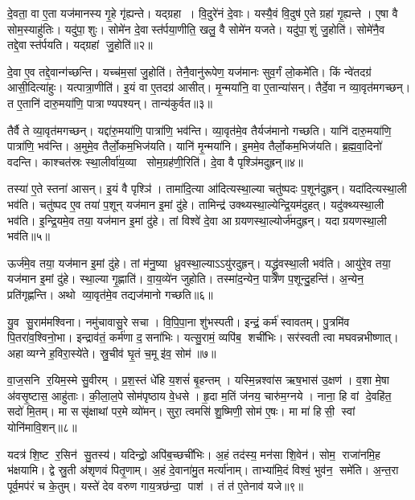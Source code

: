 दे॒वता॒ वा ए॒ता यज॑मानस्य गृ॒हे गृ॑ह्यन्ते।
यद्ग्रहा।
वि॒दुरे॑नं दे॒वाः।
यस्यै॒वं वि॒दुष॑ ए॒ते ग्रहा॑ गृ॒ह्यन्ते।
ए॒षा वै सोम॒स्याहु॑तिः।
यदु॑पा॒शुः।
सोमे॑न दे॒वास्त॑र्पया॒णीति॒ खलु॒ वै सोमे॑न यजते।
यदु॑पा॒शुं जु॒होति॑।
सोमे॑नै॒व तद्दे॒वास्त॑र्पयति।
यद्ग्रहां जु॒होति॑॥२॥

दे॒वा ए॒व तद्दे॒वान्ग॑च्छन्ति।
यच्च॑म॒सां जु॒होति॑।
तेनै॒वानु॑रूपेण॒ यज॑मानः सुव॒र्गं लो॒कमे॑ति।
किं न्वे॑तदग्र॑ आसी॒दित्या॑हुः।
यत्पात्रा॒णीति॑।
इ॒यं वा ए॒तदग्र॑ आसीत्।
मृ॒न्मया॑नि॒ वा ए॒तान्या॑सन्।
तैर्दे॒वा न व्या॒वृत॑मगच्छन्।
त ए॒तानि॑ दारु॒मया॑णि॒ पात्राण्यपश्यन्।
तान्य॑कुर्वत॥३॥

तैर्वै ते व्या॒वृत॑मगच्छन्।
यद्दा॑रु॒मया॑णि॒ पात्रा॑णि॒ भव॑न्ति।
व्या॒वृत॑मे॒व तैर्यज॑मानो गच्छति।
यानि॑ दारु॒मया॑णि॒ पात्रा॑णि॒ भव॑न्ति।
अ॒मुमे॒व तैर्लो॒कम॒भिज॑यति।
यानि॑ मृ॒न्मया॑नि।
इ॒ममे॒व तैर्लो॒कम॒भिज॑यति।
ब्र॒ह्म॒वा॒दिनो॑ वदन्ति।
काश्चत॑स्रः स्था॒लीर्वा॑य॒व्या सोम॒ग्रह॑णी॒रिति॑।
दे॒वा वै पृश्ञि॑मदुह्रन्॥४॥

तस्या॑ ए॒ते स्तना॑ आसन्।
इ॒यं वै पृश्ञि॑।
तामा॑दि॒त्या आ॑दित्यस्था॒ल्या चतु॑ष्पदः प॒शून॑दुह्रन्।
यदा॑दित्यस्था॒ली भव॑ति।
चतु॑ष्पद ए॒व तया॑ प॒शून् यज॑मान इ॒मां दु॑हे।
तामिन्द्र॑ उक्थ्यस्था॒ल्येन्द्रि॒यम॑दुहत्।
यदु॑क्थ्यस्था॒ली भव॑ति।
इ॒न्द्रि॒यमे॒व तया॒ यज॑मान इ॒मां दु॑हे।
तां विश्वे॑ दे॒वा आग्रयणस्था॒ल्योर्ज॑मदुह्रन्।
यदाग्रयणस्था॒ली भव॑ति॥५॥

ऊर्ज॑मे॒व तया॒ यज॑मान इ॒मां दु॑हे।
तां म॑नु॒ष्या ध्रुवस्था॒ल्याऽऽयु॑रदुह्रन्।
यद्ध्रु॑वस्था॒ली भव॑ति।
आयु॑रे॒व तया॒ यज॑मान इ॒मां दु॑हे।
स्था॒ल्या गृ॒ह्णाति॑।
वा॒य॒व्ये॑न जुहोति।
तस्मा॑द॒न्येन॒ पात्रे॑ण प॒शून्दु॒हन्ति॑।
अ॒न्येन॒ प्रति॑गृह्णन्ति।
अथो व्या॒वृत॑मे॒व तद्यज॑मानो गच्छति॥६॥\anuvakamend[ग्र॒ह॒त्वं ग्रहां जु॒होत्य॑कुर्वतादुह्रन्नाग्रयणस्था॒ली भव॑ति॒ नव॑ च]

यु॒व सु॒राम॑मश्विना।
नमु॑चावासु॒रे सचा।
वि॒पि॒पा॒ना शु॑भस्पती।
इन्द्रं॒ कर्म॑ स्वावतम्।
पु॒त्रमि॑व पि॒तरा॑व॒श्विनो॒भा।
इन्द्राव॑तं॒ कर्म॑णा द॒सना॑भिः।
यत्सु॒रामं॒ व्यपि॑ब॒ शची॑भिः।
सर॑स्वती त्वा मघवन्नभीष्णात्।
अहाव्यग्ने ह॒विरा॒स्ये॑ते।
स्रु॒चीव॑ घृ॒तं च॒मू इ॑व॒ सोम॑॥७॥

वा॒ज॒सनि र॒यिम॒स्मे सु॒वीरम्।
प्र॒श॒स्तं धे॑हि य॒शसं॑ बृ॒हन्तम्।
यस्मि॒न्नश्वा॑स ऋष॒भास॑ उ॒क्षण॑।
व॒शा मे॒षा अ॑वसृ॒ष्टास॒ आहु॑ताः।
की॒ला॒ल॒पे सोम॑पृष्ठाय वे॒धसे।
हृ॒दा म॒तिं ज॑नय॒ चारु॑म॒ग्नये।
नाना॒ हि वां दे॒वहि॑त॒ सदो॑ मि॒तम्।
मा ससृ॑क्षाथां पर॒मे व्यो॑मन्।
सुरा॒ त्वमसि॑ शु॒ष्मिणी॒ सोम॑ ए॒षः।
मा मा॑ हिसी॒ स्वां योनि॑मावि॒शन्॥८॥

यदत्र॑ शि॒ष्ट र॒सिन॑ सु॒तस्य॑।
यदिन्द्रो॒ अपि॑ब॒च्छची॑भिः।
अ॒हं तद॑स्य॒ मन॑सा शि॒वेन॑।
सोम॒ राजा॑नमि॒ह भ॑क्षयामि।
द्वे स्रु॒ती अ॑शृणवं पितृ॒णाम्।
अ॒हं दे॒वाना॑मु॒त मर्त्या॑नाम्।
ताभ्या॑मि॒दं विश्वं॒ भुव॑न॒ समे॑ति।
अ॒न्त॒रा पूर्व॒मप॑रं च के॒तुम्।
यस्ते॑ देव वरुण गाय॒त्रछ॑न्दा॒ पाश॑।
तं त॑ ए॒तेनाव॑ यजे॥९॥

